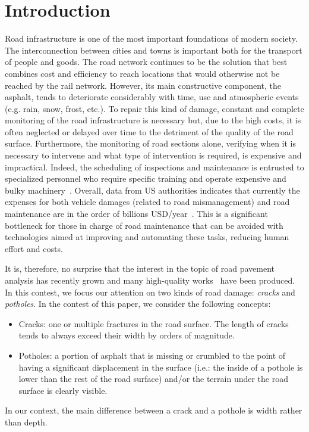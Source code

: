 \documentclass[twocolumn]{article}
\begin{document}
\section{Introduction}
\label{sec:introduction}
Road infrastructure is one of the most important foundations of modern society. The interconnection between cities and towns is important both for the transport of people and goods. The road network continues to be the solution that best combines cost and efficiency to reach locations that would otherwise not be reached by the rail network. However, its main constructive component, the asphalt, tends to deteriorate considerably with time, use and atmospheric events (e.g. rain, snow, frost, etc.). To repair this kind of damage, constant and complete monitoring of the road infrastructure is necessary but, due to the high costs, it is often neglected or delayed over time to the detriment of the quality of the road surface. Furthermore, the monitoring of road sections alone, verifying when it is necessary to intervene and what type of intervention is required, is expensive and impractical. Indeed, the scheduling of inspections and maintenance is entrusted to specialized personnel who require specific training and operate expensive and bulky machinery~\cite{DU2021}. Overall, data from US authorities indicates that currently the expenses for both vehicle damages (related to road mismanagement) and road maintenance are in the order of billions USD/year~\cite{tripreport2018}. This is a significant bottleneck for those in charge of road maintenance that can be avoided with technologies aimed at improving and automating these tasks, reducing human effort and costs. 

It is, therefore, no surprise that the interest in the topic of road pavement analysis has recently grown and many high-quality works~\cite{DU2021} have been produced.
In this contest, we focus our attention on two kinds of road damage: \emph{cracks} and \emph{potholes}. In the contest of this paper, we consider the following concepts: 
\begin{itemize}
    \item Cracks: one or multiple fractures in the road surface. The length of cracks tends to always exceed their width by orders of magnitude.
    \item Potholes: a portion of asphalt that is missing or crumbled to the point of having a significant displacement in the surface (i.e.: the inside of a pothole is lower than the rest of the road surface) and/or the terrain under the road surface is clearly visible. 
\end{itemize}
In our context, the main difference between a crack and a pothole is width rather than depth.
\end{document}
